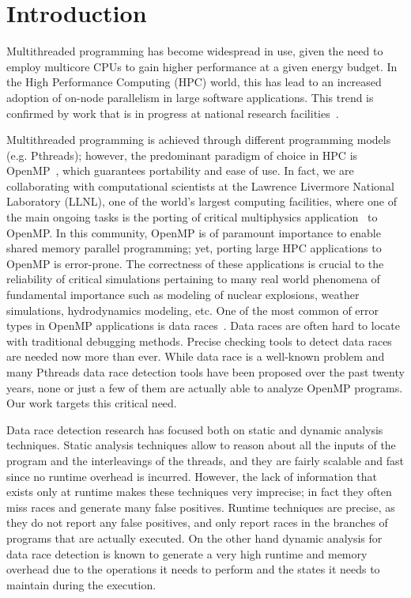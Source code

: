 \section{Introduction}
\label{sec:introduction}

Multithreaded programming has become widespread
in use, given the need to employ multicore
CPUs to gain higher performance at a given energy budget.
%
In the High Performance Computing (HPC) world, 
this has lead to
an increased adoption of
on-node parallelism 
in large software applications.
%
This trend
is confirmed
by work that is in progress 
at national research
facilities~\cite{sierra, summit, trinity}.


Multithreaded programming is achieved through 
different programming models (e.g. Pthreads); 
however, the predominant paradigm of choice in HPC is
OpenMP~\cite{ompdoc}, 
which guarantees portability and ease of use.
%
In fact, we are collaborating with computational 
scientists at the Lawrence
Livermore National Laboratory (LLNL), 
one of the world's largest computing
facilities, 
where one of the main ongoing tasks
is the porting of critical
multiphysics application~\cite{llnl-apps} to OpenMP.
%
In this community,
OpenMP is of paramount importance to enable
shared memory parallel programming; yet,
porting large HPC applications to OpenMP is error-prone.
%
The correctness of these applications is 
crucial to the reliability of critical
simulations pertaining to 
many real world phenomena of fundamental importance
such as modeling of nuclear explosions, 
weather simulations, hydrodynamics
modeling, etc.
%
One of the most common of error
types in OpenMP applications is data
races~\cite{sus_common_2008}.
%
Data races are often hard to locate
with traditional debugging methods.
%
Precise checking tools to detect data races
are needed now more than ever.
%
While data race is a 
well-known problem and many Pthreads data race detection
tools have been proposed over the past twenty years, 
none or just a few of
them are actually able to analyze OpenMP programs.
%
Our work targets this critical need.

Data race detection research has focused both on 
static and dynamic analysis
techniques.
%
Static analysis techniques allow to 
reason about all the inputs of the program
and the interleavings of the threads, 
and they are fairly scalable and fast
since no runtime overhead is incurred.
%
However, the lack of information that exists 
only at runtime makes these
techniques very imprecise;
in fact they often miss races and generate many false
positives.
%
Runtime techniques are  precise, as
they do not report any false
positives, and only report races in 
the branches of programs that are
actually executed.
%
On the other hand dynamic analysis for data race detection is known to
generate a very high runtime and memory overhead due to the operations it
needs to perform and the states it needs to maintain during the execution.

